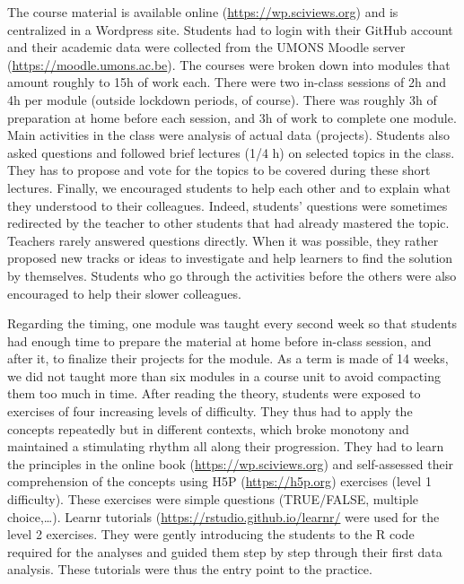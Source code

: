 \documentclass{aims}
\theoremstyle{definition}
\begin{document}
The course material is available online (\url{https://wp.sciviews.org})
and is centralized in a Wordpress site. Students had to login with their
GitHub account and their academic data were collected from the UMONS
Moodle server (\url{https://moodle.umons.ac.be}). The courses were
broken down into modules that amount roughly to 15h of work each. There
were two in-class sessions of 2h and 4h per module (outside lockdown
periods, of course). There was roughly 3h of preparation at home before
each session, and 3h of work to complete one module. Main activities in
the class were analysis of actual data (projects). Students also asked
questions and followed brief lectures (1/4 h) on selected topics in the
class. They has to propose and vote for the topics to be covered during
these short lectures. Finally, we encouraged students to help each other
and to explain what they understood to their colleagues. Indeed,
students' questions were sometimes redirected by the teacher to other
students that had already mastered the topic. Teachers rarely answered
questions directly. When it was possible, they rather proposed new
tracks or ideas to investigate and help learners to find the solution by
themselves. Students who go through the activities before the others
were also encouraged to help their slower colleagues.

Regarding the timing, one module was taught every second week so that
students had enough time to prepare the material at home before in-class
session, and after it, to finalize their projects for the module. As a
term is made of 14 weeks, we did not taught more than six modules in a
course unit to avoid compacting them too much in time. After reading the
theory, students were exposed to exercises of four increasing levels of
difficulty. They thus had to apply the concepts repeatedly but in
different contexts, which broke monotony and maintained a stimulating
rhythm all along their progression. They had to learn the principles in
the online book (\url{https://wp.sciviews.org}) and self-assessed their
comprehension of the concepts using H5P (\url{https://h5p.org})
exercises (level 1 difficulty). These exercises were simple questions
(TRUE/FALSE, multiple choice,\ldots). Learnr tutorials
(\url{https://rstudio.github.io/learnr/} were used for the level 2
exercises. They were gently introducing the students to the R code
required for the analyses and guided them step by step through their
first data analysis. These tutorials were thus the entry point to the
practice.
\end{document}
